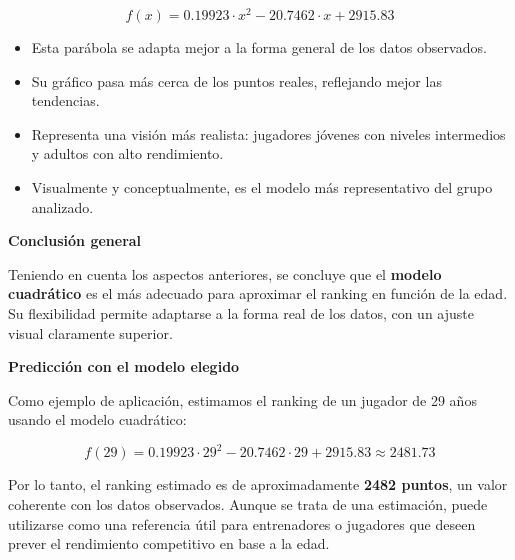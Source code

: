 \documentclass[12pt]{article}
\begin{document}
\[
f(x) = 0.19923 \cdot x^2 - 20.7462 \cdot x + 2915.83
\]

\begin{itemize}
    \item Esta parábola se adapta mejor a la forma general de los datos observados.
    \item Su gráfico pasa más cerca de los puntos reales, reflejando mejor las tendencias.
    \item Representa una visión más realista: jugadores jóvenes con niveles intermedios y adultos con alto rendimiento.
    \item Visualmente y conceptualmente, es el modelo más representativo del grupo analizado.
\end{itemize}

\vspace{0.4cm}
\noindent\textbf{Conclusión general}

Teniendo en cuenta los aspectos anteriores, se concluye que el \textbf{modelo cuadrático} es el más adecuado para aproximar el ranking en función de la edad. Su flexibilidad permite adaptarse a la forma real de los datos, con un ajuste visual claramente superior.

\vspace{0.4cm}
\noindent\textbf{Predicción con el modelo elegido}

Como ejemplo de aplicación, estimamos el ranking de un jugador de 29 años usando el modelo cuadrático:

\[
f(29) = 0.19923 \cdot 29^2 - 20.7462 \cdot 29 + 2915.83 \approx 2481.73
\]

Por lo tanto, el ranking estimado es de aproximadamente \textbf{2482 puntos}, un valor coherente con los datos observados. Aunque se trata de una estimación, puede utilizarse como una referencia útil para entrenadores o jugadores que deseen prever el rendimiento competitivo en base a la edad.
\end{document}
